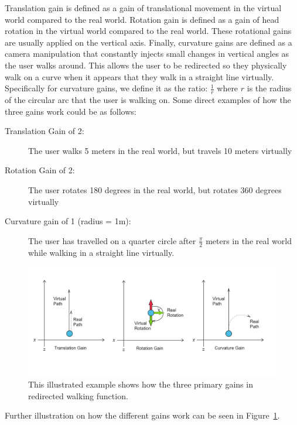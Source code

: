 Translation gain is defined as a gain of translational movement in the virtual world compared to the real world. Rotation gain is defined as a gain of head rotation in the virtual world compared to the real world. These rotational gains are usually applied on the vertical axis. Finally, curvature gains are defined as a camera manipulation that constantly injects small changes in vertical angles as the user walks around. This allows the user to be redirected so they physically walk on a curve when it appears that they walk in a straight line virtually. Specifically for curvature gains, we define it as the ratio: $\frac{1}{r}$ where $r$ is the radius of the circular arc that the user is walking on. Some direct examples of how the three gains work could be as follows:
\begin{description}
    \item[Translation Gain of 2:] The user walks 5 meters in the real world, but travels 10 meters virtually
    \item[Rotation Gain of 2:] The user rotates 180 degrees in the real world, but rotates 360 degrees virtually
    \item[Curvature gain of 1 (radius = 1m):] The user has travelled on a quarter circle after $\frac{\pi}{2}$ meters in the real world while walking in a straight line virtually.
\end{description}

\begin{figure}[tbph]
    \centering
    \includegraphics[width=1.0\textwidth]{figures/graphs/redirectionGains.png}
    \caption[Illustrated Example of How Redirection Gains Function]{This illustrated example shows how the three primary gains in redirected walking function.}
    \label{fig:redirectionGainsExample}
\end{figure}

Further illustration on how the different gains work can be seen in Figure~\ref{fig:redirectionGainsExample}.

